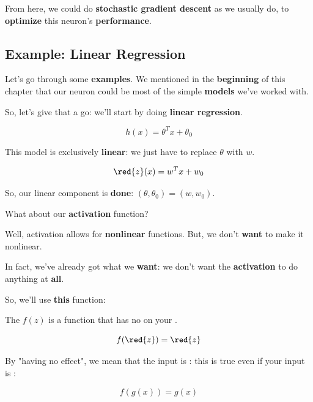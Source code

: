         From here, we could do \textbf{stochastic gradient descent} as we usually do, to \textbf{optimize} this neuron's \textbf{performance}.
        
    \subsection{Example: Linear Regression}
    
        Let's go through some \textbf{examples}. We mentioned in the \textbf{beginning} of this chapter that our neuron could be most of the simple \textbf{models} we've worked with.
        
        So, let's give that a go: we'll start by doing \textbf{linear regression}.
        
        \begin{equation*}
            h(x) = \theta^T x + \theta_0
        \end{equation*}
        
        This model is exclusively \textbf{linear}: we just have to replace $\theta$ with $w$.
        
        \begin{equation*}
            \red{z}(x) = w^T x + w_0
        \end{equation*}
        
        So, our linear component is \textbf{done}: $(\theta, \theta_0) = (w, w_0)$.
        
        What about our \textbf{activation} function?
        
        Well, activation allows for \textbf{nonlinear} functions. But, we don't \textbf{want} to make it nonlinear. 
        
        In fact, we've already got what we \textbf{want}: we don't want the \textbf{activation} to do anything at \textbf{all}.
        
        So, we'll use \textbf{this} function:\\
        
        \begin{concept}
            The  $f(z)$ is a function that has no  on your .
            
            \begin{equation*}
                f(\red{z}) = \red{z}
            \end{equation*}
            
            By "having no effect", we mean that the input is : this is true even if your input is :
            
            \begin{equation}
                f(g(x)) = g(x)
            \end{equation}
        \end{concept}
        

